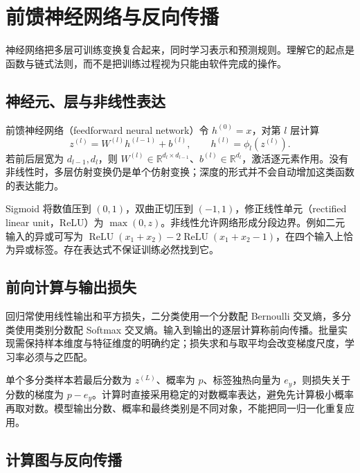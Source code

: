 \setcounter{chapter}{16} %
\chapter{前馈神经网络与反向传播}
\label{chap:ml-networks}

神经网络把多层可训练变换复合起来，同时学习表示和预测规则。理解它的起点是函数与链式法则，而不是把训练过程视为只能由软件完成的操作。

\section{神经元、层与非线性表达}

前馈神经网络（feedforward neural network）令 $h^{(0)}=x$，对第 $l$ 层计算
\begin{equation}
 z^{(l)}=W^{(l)}h^{(l-1)}+b^{(l)},\qquad
 h^{(l)}=\phi_l(z^{(l)}).
 \label{eq:ml-network-forward}
\end{equation}
若前后层宽为 $d_{l-1},d_l$，则 $W^{(l)}\in\mathbb R^{d_l\times d_{l-1}}$、$b^{(l)}\in\mathbb R^{d_l}$，激活逐元素作用。没有非线性时，多层仿射变换仍是单个仿射变换；深度的形式并不会自动增加这类函数的表达能力。

Sigmoid 将数值压到 $(0,1)$，双曲正切压到 $(-1,1)$，修正线性单元（rectified linear unit，ReLU）为 $\max(0,z)$。非线性允许网络形成分段边界。例如二元输入的异或可写为 $\operatorname{ReLU}(x_1+x_2)-2\operatorname{ReLU}(x_1+x_2-1)$，在四个输入上恰为异或标签。存在表达式不保证训练必然找到它。

\section{前向计算与输出损失}

回归常使用线性输出和平方损失，二分类使用一个分数配 Bernoulli 交叉熵，多分类使用类别分数配 Softmax 交叉熵。输入到输出的逐层计算称前向传播。批量实现需保持样本维度与特征维度的明确约定；损失求和与取平均会改变梯度尺度，学习率必须与之匹配。

单个多分类样本若最后分数为 $z^{(L)}$、概率为 $p$、标签独热向量为 $e_y$，则损失关于分数的梯度为 $p-e_y$。计算时直接采用稳定的对数概率表达，避免先计算极小概率再取对数。模型输出分数、概率和最终类别是不同对象，不能把同一归一化重复应用。

\section{计算图与反向传播}


